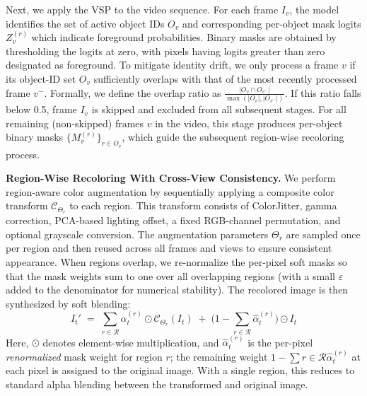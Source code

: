\documentclass[10pt,twocolumn,letterpaper]{article}
\begin{document}
Next, we apply the VSP to the video sequence. For each frame $I_{v}$, the model identifies the set of active object IDs $O_v$ and corresponding per-object mask logits $Z_v^{(r)}$ which indicate foreground probabilities. Binary masks are obtained by thresholding the logits at zero, with pixels having logits greater than zero designated as foreground.
To mitigate identity drift, we only process a frame $v$ if its object-ID set $O_v$ sufficiently overlaps with that of the most recently processed frame $v^-$. Formally, we define the overlap ratio as $\frac{|O_v \cap O_{v^-}|}{\max(|O_v|, |O_{v^-}|)}$. If this ratio falls below 0.5, frame $I_v$ is skipped and excluded from all subsequent stages.
For all remaining (non-skipped) frames $v$ in the video, this stage produces per-object binary masks $\{M_v^{(r)}\}_{r \in O_v}$, which guide the subsequent region-wise recoloring process.

\vspace{1mm}
\noindent\textbf{Region-Wise Recoloring With Cross-View Consistency.}
We perform region-aware color augmentation by sequentially applying a composite color transform $\mathcal{C}_{\Theta_r}$ to each region. This transform consists of ColorJitter, gamma correction, PCA-based lighting offset, a fixed RGB-channel permutation, and optional grayscale conversion. The augmentation parameters $\Theta_r$ are sampled once per region and then reused across all frames and views to ensure consistent appearance.
%
When regions overlap, we re-normalize the per-pixel soft masks so that the mask weights sum to one over all overlapping regions (with a small $\varepsilon$ added to the denominator for numerical stability). The recolored image is then synthesized by soft blending:
\begin{equation*}
I_t' \;=\; 
\sum_{r\in\mathcal{R}} \hat{\alpha}_t^{(r)} \odot \mathcal{C}_{\Theta_r}(I_t)
\;+\;
\Big(1 - \sum_{r\in\mathcal{R}} \hat{\alpha}_t^{(r)}\Big) \odot I_t
\end{equation*}
Here, \(\odot\) denotes element-wise multiplication, and \(\hat{\alpha}_t^{(r)}\) is the per-pixel \emph{renormalized} mask weight for region \(r\); the remaining weight $1 - \sum{r\in\mathcal{R}} \hat{\alpha}_t^{(r)}$ at each pixel is assigned to the original image.
With a single region, this reduces to standard alpha blending between the transformed and original image.
\end{document}
